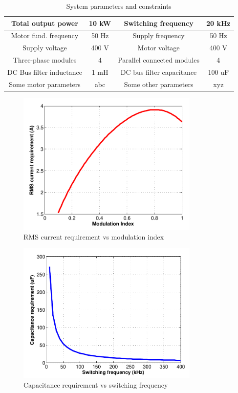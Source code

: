 \documentclass[conference,a4paper,twocolumn]{IEEEtran}
\begin{document}
\begin{table}[h]
\renewcommand{\arraystretch}{1.4}
\caption{System parameters and constraints}
\label{table2}
\centering
\begin{tabular}{|c|c|c|c|}
\hline
Total output power & 10 kW & Switching frequency & 20 kHz\\
\hline
Motor fund. frequency & 50 Hz & Supply frequency & 50 Hz\\
\hline
Supply voltage & 400 V & Motor voltage & 400 V\\
\hline
Three-phase modules & 4 & Parallel connected modules & 4\\
\hline
DC Bus filter inductance & 1 mH & DC bus filter capacitance & 100 uF\\
\hline
Some motor parameters & abc & Some other parameters & xyz\\
\hline
\end{tabular}
\end{table}


\begin{figure}[h]
  \centering
  \includegraphics[width=9cm]{fig7_2}
  \caption{RMS current requirement vs modulation index}
  \label{fig7}
\end{figure}


\begin{figure}[h]
  \centering
  \includegraphics[width=9cm]{fig8_2}
  \caption{Capacitance requirement vs switching frequency}
  \label{fig8}
\end{figure}
\end{document}
